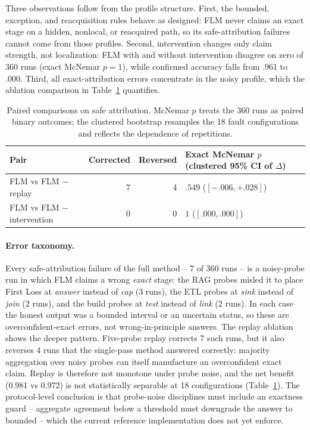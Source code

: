\documentclass[10pt]{article}
\begin{document}
Three observations follow from the profile structure. First, the bounded, exception, and reacquisition rules behave as designed: FLM never claims an exact stage on a hidden, nonlocal, or reacquired path, so its safe-attribution failures cannot come from those profiles. Second, intervention changes only claim strength, not localization: FLM with and without intervention disagree on zero of 360 runs (exact McNemar $p=1$), while confirmed accuracy falls from .961 to .000. Third, all exact-attribution errors concentrate in the noisy profile, which the ablation comparison in Table~\ref{tab:runtime-paired} quantifies.

\begin{table}[t]
\centering
\caption{Paired comparisons on safe attribution. McNemar $p$ treats the 360 runs as paired binary outcomes; the clustered bootstrap resamples the 18 fault configurations and reflects the dependence of repetitions.}
\label{tab:runtime-paired}
\begin{tabular}{lrrl}
\toprule
Pair & Corrected & Reversed & Exact McNemar $p$ (clustered 95\% CI of $\Delta$) \\
\midrule
FLM vs FLM $-$replay & 7 & 4 & $.549$ ($[-.006, +.028]$) \\
FLM vs FLM $-$intervention & 0 & 0 & $1$ ($[.000, .000]$) \\
\bottomrule
\end{tabular}
\end{table}

\paragraph{Error taxonomy.}
Every safe-attribution failure of the full method -- 7 of 360 runs -- is a noisy-probe run in which FLM claims a wrong \emph{exact} stage: the RAG probes misled it to place First Loss at \emph{answer} instead of \emph{cap} (3 runs), the ETL probes at \emph{sink} instead of \emph{join} (2 runs), and the build probes at \emph{test} instead of \emph{link} (2 runs). In each case the honest output was a bounded interval or an uncertain status, so these are overconfident-exact errors, not wrong-in-principle answers. The replay ablation shows the deeper pattern. Five-probe replay corrects 7 such runs, but it also reverses 4 runs that the single-pass method answered correctly: majority aggregation over noisy probes can itself manufacture an overconfident exact claim. Replay is therefore not monotone under probe noise, and the net benefit (0.981 vs 0.972) is not statistically separable at 18 configurations (Table~\ref{tab:runtime-paired}). The protocol-level conclusion is that probe-noise disciplines must include an exactness guard -- aggregate agreement below a threshold must downgrade the answer to bounded -- which the current reference implementation does not yet enforce.
\end{document}
